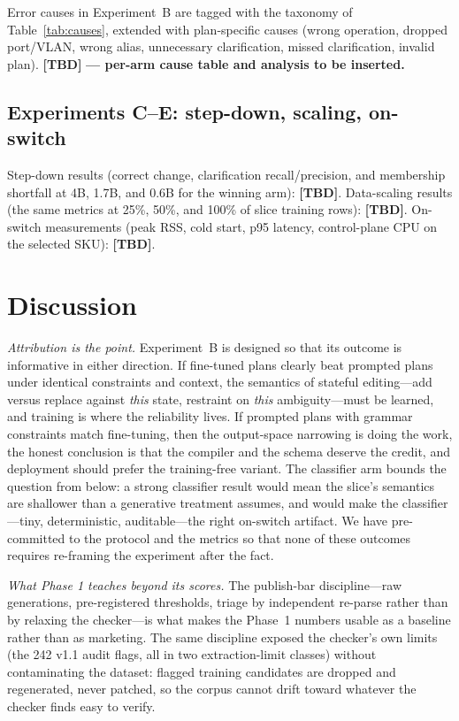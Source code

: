 \documentclass[conference]{IEEEtran}
\newcommand{\tbd}{\textbf{[TBD]}}
\begin{document}
Error causes in Experiment~B are tagged with the taxonomy of Table~\ref{tab:causes}, extended with plan-specific causes (wrong operation, dropped port/VLAN, wrong alias, unnecessary clarification, missed clarification, invalid plan). \tbd{} \textbf{--- per-arm cause table and analysis to be inserted.}

\subsection{Experiments C--E: step-down, scaling, on-switch}

Step-down results (correct change, clarification recall/precision, and membership shortfall at 4B, 1.7B, and 0.6B for the winning arm): \tbd{}. Data-scaling results (the same metrics at 25\%, 50\%, and 100\% of slice training rows): \tbd{}. On-switch measurements (peak RSS, cold start, p95 latency, control-plane CPU on the selected SKU): \tbd{}.

\section{Discussion}
\label{sec:discussion}

\emph{Attribution is the point.} Experiment~B is designed so that its outcome is informative in either direction. If fine-tuned plans clearly beat prompted plans under identical constraints and context, the semantics of stateful editing---add versus replace against \emph{this} state, restraint on \emph{this} ambiguity---must be learned, and training is where the reliability lives. If prompted plans with grammar constraints match fine-tuning, then the output-space narrowing is doing the work, the honest conclusion is that the compiler and the schema deserve the credit, and deployment should prefer the training-free variant. The classifier arm bounds the question from below: a strong classifier result would mean the slice's semantics are shallower than a generative treatment assumes, and would make the classifier---tiny, deterministic, auditable---the right on-switch artifact. We have pre-committed to the protocol and the metrics so that none of these outcomes requires re-framing the experiment after the fact.

\emph{What Phase 1 teaches beyond its scores.} The publish-bar discipline---raw generations, pre-registered thresholds, triage by independent re-parse rather than by relaxing the checker---is what makes the Phase~1 numbers usable as a baseline rather than as marketing. The same discipline exposed the checker's own limits (the 242 v1.1 audit flags, all in two extraction-limit classes) without contaminating the dataset: flagged training candidates are dropped and regenerated, never patched, so the corpus cannot drift toward whatever the checker finds easy to verify.
\end{document}
